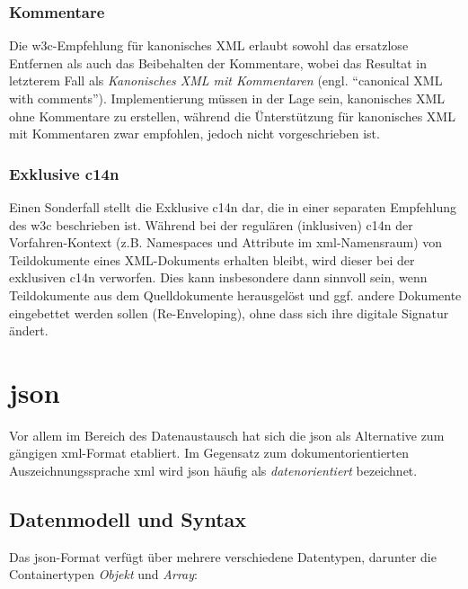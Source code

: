 \subsubsection{Kommentare}

Die \gls{w3c}-Empfehlung für kanonisches XML erlaubt sowohl das ersatzlose Entfernen als auch das Beibehalten der Kommentare, wobei das Resultat in letzterem Fall als \emph{Kanonisches XML mit Kommentaren} (engl. \enquote{canonical XML with comments})\cite[Abschnitt 2.1]{boyer2001c14n}. Implementierung müssen in der Lage sein, kanonisches XML ohne Kommentare zu erstellen, während die Ünterstützung für kanonisches XML mit Kommentaren zwar empfohlen, jedoch nicht vorgeschrieben ist.

\subsubsection{Exklusive \acrlong{c14n}}

Einen Sonderfall stellt die Exklusive \acrlong{c14n} dar, die in einer separaten Empfehlung des \gls{w3c} beschrieben ist.\cite{boyer2002excc14n} Während bei der regulären (inklusiven) \acrlong{c14n} der Vorfahren-Kontext (z.B. Namespaces und Attribute im \acrshort{xml}-Namensraum) von Teildokumente eines XML-Dokuments erhalten bleibt, wird dieser bei der exklusiven \acrshort{c14n} verworfen.\cite[Abschnitt~18]{siddiqui2002c14n2} Dies kann insbesondere dann sinnvoll sein, wenn Teildokumente aus dem Quelldokumente herausgelöst und ggf. andere Dokumente eingebettet werden sollen (Re-Enveloping), ohne dass sich ihre digitale Signatur ändert.

\section{\acrfull{json}}

Vor allem im Bereich des Datenaustausch hat sich die \acrfull{json} als Alternative zum gängigen \acrshort{xml}-Format etabliert. Im Gegensatz zum dokumentorientierten Auszeichnungssprache \acrshort{xml} wird \acrshort{json} häufig als \emph{datenorientiert} bezeichnet.\cite{gupta2007xmljson}

\subsection{Datenmodell und Syntax}

Das \acrshort{json}-Format verfügt über mehrere verschiedene Datentypen, darunter die Containertypen \emph{Objekt} und \emph{Array}:\cite{ecma404}

